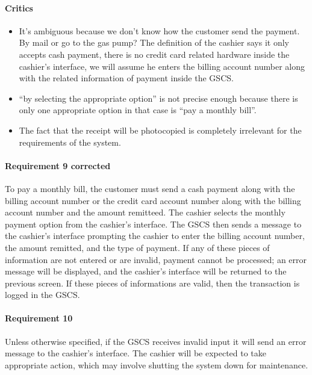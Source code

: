\begin{framed}
    \paragraph{Critics}
    \begin{itemize}
        \item It's ambiguous because we don't know how the customer send
            the payment. By mail or go to the gas pump? The definition of the
            cashier says it only accepts cash payment, there is no credit card
            related hardware inside the cashier's interface, we will assume he
            enters the billing account number along with the related information
            of payment inside the GSCS.\@

        \item \enquote{by selecting the appropriate option} is not precise
            enough because there is only one appropriate option in that case is
            \enquote{pay a monthly bill}.

        \item The fact that the receipt will be photocopied is
            completely irrelevant for the requirements of the system.
    \end{itemize}

    \paragraph{Requirement 9 corrected} To pay a monthly bill, the customer must send
    a cash payment along with the billing account number or the credit card account
    number along with the billing account number and the amount remitteed. The
    cashier selects the monthly payment option from the
    cashier's interface. The GSCS then sends a message to the cashier's interface
    prompting the cashier to enter the billing account number, the amount
    remitted, and the type of payment. If any of these pieces of information
    are not entered or are invalid, payment cannot be processed; an error
    message will be displayed, and the cashier's interface will be returned
    to the previous screen. If these pieces of informations are valid, then the
    transaction is logged in the GSCS.\@
\end{framed}

\paragraph{Requirement 10} Unless otherwise specified, if the GSCS receives
invalid input it will send an error message to the cashier's interface.
The cashier will be expected to take appropriate action, which may
involve shutting the system down for maintenance.

